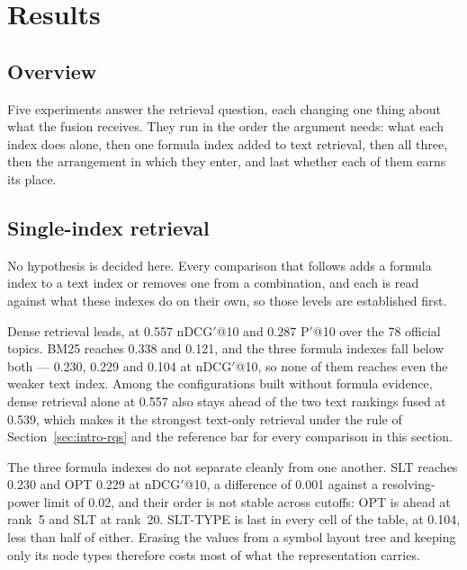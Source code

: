 \section{Results}\label{sec:ret-results}

\subsection{Overview}\label{sec:res-intro}

Five experiments answer the retrieval question, each changing one thing about what the
fusion receives. They run in the order the argument needs: what each index does alone, then
one formula index added to text retrieval, then all three, then the arrangement in which
they enter, and last whether each of them earns its place.

\subsection{Single-index retrieval}\label{sec:res-single-index}

No hypothesis is decided here. Every comparison that follows adds a formula index to a text
index or removes one from a combination, and each is read against what these indexes do on
their own, so those levels are established first.

Dense retrieval leads, at 0.557 nDCG$'$@10 and 0.287 P$'$@10 over the 78 official topics.
BM25 reaches 0.338 and 0.121, and the three formula indexes fall below both --- 0.230, 0.229
and 0.104 at nDCG$'$@10, so none of them reaches even the weaker text index. Among the
configurations built without formula evidence, dense retrieval alone at 0.557 also stays
ahead of the two text rankings fused at 0.539, which makes it the strongest text-only
retrieval under the rule of Section~\ref{sec:intro-rqs} and the reference bar for every
comparison in this section.

The three formula indexes do not separate cleanly from one another. SLT reaches 0.230 and OPT
0.229 at nDCG$'$@10, a difference of 0.001 against a resolving-power limit of 0.02, and their
order is not stable across cutoffs: OPT is ahead at rank~5 and SLT at rank~20. SLT-TYPE is
last in every cell of the table, at 0.104, less than half of either. Erasing the values from a
symbol layout tree and keeping only its node types therefore costs most of what the
representation carries.

